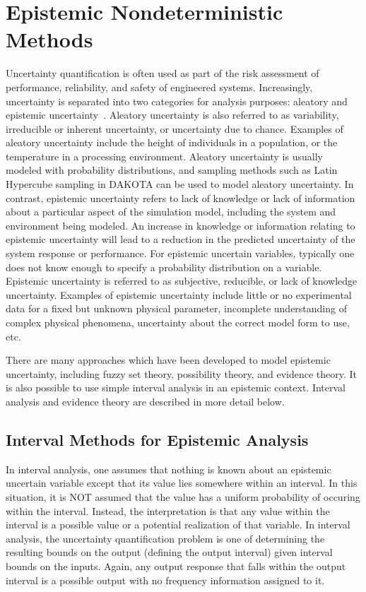 \section{Epistemic Nondeterministic Methods}\label{uq:epistemic}

Uncertainty quantification is often used as part of the risk
assessment of performance, reliability, and safety of engineered
systems.  Increasingly, uncertainty is separated into two categories
for analysis purposes: aleatory and epistemic
uncertainty~\cite{Obe03,Hel07}. Aleatory uncertainty is also referred to as
variability, irreducible or inherent uncertainty, or uncertainty due
to chance. Examples of aleatory uncertainty include the height of
individuals in a population, or the temperature in a processing
environment.  Aleatory uncertainty is usually modeled with probability
distributions, and sampling methods such as Latin Hypercube sampling
in DAKOTA can be used to model aleatory uncertainty. In contrast,
epistemic uncertainty refers to lack of knowledge or lack of
information about a particular aspect of the simulation model,
including the system and environment being modeled. An increase in
knowledge or information relating to epistemic uncertainty will lead
to a reduction in the predicted uncertainty of the system response or
performance. For epistemic uncertain variables, typically one does not
know enough to specify a probability distribution on a variable.
Epistemic uncertainty is referred to as subjective, reducible, or lack
of knowledge uncertainty. Examples of epistemic uncertainty include
little or no experimental data for a fixed but unknown physical
parameter, incomplete understanding of complex physical phenomena,
uncertainty about the correct model form to use, etc.

There are many approaches which have been developed to model epistemic
uncertainty, including fuzzy set theory, possibility theory, and
evidence theory. It is also possible to use simple interval analysis in 
an epistemic context.  Interval analysis and evidence theory are 
described in more detail below.

\subsection{Interval Methods for Epistemic Analysis}\label{uq:interval}
In interval analysis, one assumes that nothing is known about 
an epistemic uncertain variable except that its value lies 
somewhere within an interval.  In this situation, it is NOT 
assumed that the value has a uniform probability of occuring 
within the interval.  Instead, the interpretation is that 
any value within the interval is a possible value or a potential 
realization of that variable.  In interval analysis, the 
uncertainty quantification problem is one of determining the 
resulting bounds on the output (defining the output interval) 
given interval bounds on the inputs. Again, any output response 
that falls within the output interval is a possible output 
with no frequency information assigned to it.

